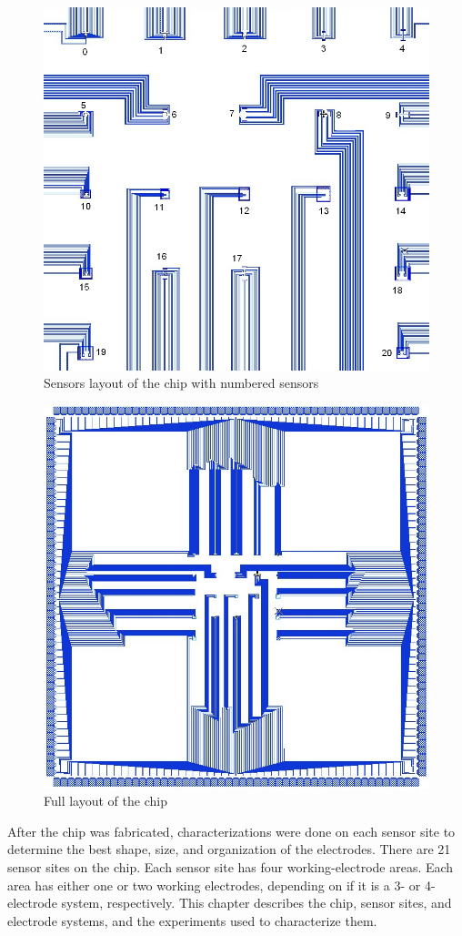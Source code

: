 \begin{figure}
	\centering
	\includegraphics[width=0.8\linewidth]{figures/biosensorchip-sensors.png}
	\caption[Sensors layout of the chip]{Sensors layout of the chip with numbered sensors}
	\label{biosensorchip-sensors}
\end{figure}

\begin{figure}
	\centering
	\includegraphics[width=0.5\linewidth]{figures/biosensorchip.png}
	\caption{Full layout of the chip}
	\label{biosensorchip}
\end{figure}

After the chip was fabricated, characterizations were done on each sensor site to determine the best shape, size, and organization of the electrodes. There are 21 sensor sites on the chip. Each sensor site has four working-electrode areas. Each area has either one or two working electrodes, depending on if it is a 3- or 4-electrode system, respectively. This chapter describes the chip, sensor sites, and electrode systems, and the experiments used to characterize them.

